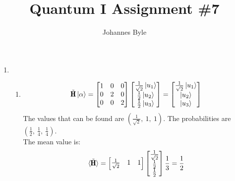 \documentclass[12pt]{article}
\title{Quantum I Assignment \#7}
\author{Johannes Byle}
\newcommand{\OP}[1]{\tilde{\pmb{\text{#1}}}}
\begin{document}
    \maketitle
    \begin{enumerate}
        \item
        \begin{enumerate}
            \item
            \begin{gather*}
                \OP{H}\ket{\alpha}=
                \begin{bmatrix}
                    1 & 0 & 0 \\
                    0 & 2 & 0 \\
                    0 & 0 & 2
                \end{bmatrix}
                \begin{bmatrix}
                    \frac{1}{\sqrt{2}}\ket{u_1} \\
                    \frac{1}{2}\ket{u_2}        \\
                    \frac{1}{2}\ket{u_3}
                \end{bmatrix}
                =
                \begin{bmatrix}
                    \frac{1}{\sqrt{2}}\ket{u_1} \\
                    \ket{u_2}                   \\
                    \ket{u_3}
                \end{bmatrix}
            \end{gather*}
            The values that can be found are $\left( \frac{1}{\sqrt{2}},\ 1,\ 1 \right)$.
            The probabilities are $\left( \frac{1}{2},\ \frac{1}{4},\ \frac{1}{4} \right)$.\\
            The mean value is:
            \begin{gather*}
                \braket{\OP{H}}=
                \begin{bmatrix}
                    \frac{1}{\sqrt{2}} & 1 & 1
                \end{bmatrix}
                \begin{bmatrix}
                    \frac{1}{\sqrt{2}} \\
                    \frac{1}{2}        \\
                    \frac{1}{2}
                \end{bmatrix}\frac{1}{3}=\frac{1}{2}
            \end{gather*}

\end{enumerate}
\end{enumerate}
\end{document}
